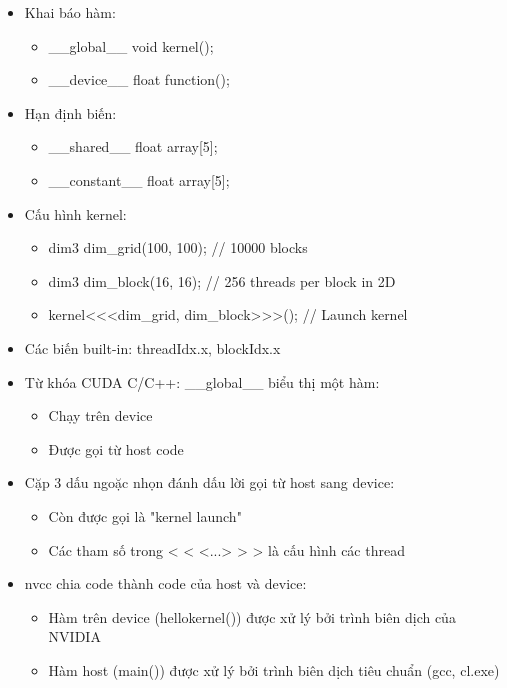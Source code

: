 \documentclass[14pt, a4paper]{article}
\numberwithin{equation}{section}
\numberwithin{figure}{section}
\numberwithin{dl}{section}
\numberwithin{md}{section}
\numberwithin{bd}{section}
\numberwithin{dn}{section}
\numberwithin{hq}{section}
\begin{document}
\begin{itemize}
    \item Khai báo hàm:
    \begin{itemize}
        \item \_\_global\_\_ void kernel();
        \item \_\_device\_\_ float function();
    \end{itemize}
    \item Hạn định biến:
    \begin{itemize}
        \item \_\_shared\_\_ float array[5];
        \item \_\_constant\_\_ float array[5];
    \end{itemize}
    \item Cấu hình kernel:
    \begin{itemize}
        \item dim3 dim\_grid(100, 100); // 10000 blocks
        \item dim3 dim\_block(16, 16); // 256 threads per block in 2D
        \item kernel<<<dim\_grid, dim\_block>>>(); // Launch kernel
    \end{itemize}
    \item Các biến built-in: threadIdx.x, blockIdx.x
\end{itemize}

\begin{itemize}
    \item Từ khóa CUDA C/C++: \_\_global\_\_ biểu thị một hàm:
    \begin{itemize}
        \item Chạy trên device 
        \item Được gọi từ host code
    \end{itemize}
    \item Cặp 3 dấu ngoặc nhọn đánh dấu lời gọi từ host sang device:
    \begin{itemize}
        \item Còn được gọi là "kernel launch"
        \item Các tham số trong < < <...> > > là cấu hình các thread
    \end{itemize}
    \item nvcc chia code thành code của host và device:
    \begin{itemize}
        \item Hàm trên device (hellokernel()) được xử lý bởi trình biên dịch của NVIDIA
        \item Hàm host (main()) được xử lý bởi trình biên dịch tiêu chuẩn (gcc, cl.exe)
    \end{itemize}
\end{itemize}
\end{document}
